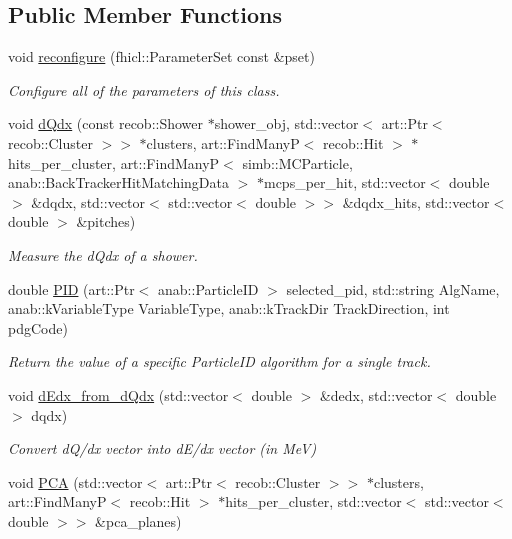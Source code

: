 \subsection*{Public Member Functions}
\begin{DoxyCompactItemize}
\item 
void \hyperlink{group__lee_ga4523185d78d6b7aa94dbf26475750282}{reconfigure} (fhicl\-::\-Parameter\-Set const \&pset)
\begin{DoxyCompactList}\small\item\em Configure all of the parameters of this class. \end{DoxyCompactList}\item 
void \hyperlink{group__lee_ga7ccbc2f2f2b594291e89f29c8e4616a7}{d\-Qdx} (const recob\-::\-Shower $\ast$shower\-\_\-obj, std\-::vector$<$ art\-::\-Ptr$<$ recob\-::\-Cluster $>$$>$ $\ast$clusters, art\-::\-Find\-Many\-P$<$ recob\-::\-Hit $>$ $\ast$hits\-\_\-per\-\_\-cluster, art\-::\-Find\-Many\-P$<$ simb\-::\-M\-C\-Particle, anab\-::\-Back\-Tracker\-Hit\-Matching\-Data $>$ $\ast$mcps\-\_\-per\-\_\-hit, std\-::vector$<$ double $>$ \&dqdx, std\-::vector$<$ std\-::vector$<$ double $>$$>$ \&dqdx\-\_\-hits, std\-::vector$<$ double $>$ \&pitches)
\begin{DoxyCompactList}\small\item\em Measure the d\-Qdx of a shower. \end{DoxyCompactList}\item 
double \hyperlink{group__lee_gab3e573f8d2d733f94b8ca862d7343864}{P\-I\-D} (art\-::\-Ptr$<$ anab\-::\-Particle\-I\-D $>$ selected\-\_\-pid, std\-::string Alg\-Name, anab\-::k\-Variable\-Type Variable\-Type, anab\-::k\-Track\-Dir Track\-Direction, int pdg\-Code)
\begin{DoxyCompactList}\small\item\em Return the value of a specific Particle\-I\-D algorithm for a single track. \end{DoxyCompactList}\item 
void \hyperlink{group__lee_ga2844c7f27f79fbe5e16d9c674ca4afa1}{d\-Edx\-\_\-from\-\_\-d\-Qdx} (std\-::vector$<$ double $>$ \&dedx, std\-::vector$<$ double $>$ dqdx)
\begin{DoxyCompactList}\small\item\em Convert d\-Q/dx vector into d\-E/dx vector (in Me\-V) \end{DoxyCompactList}\item 
void \hyperlink{group__lee_gac5f41d2b1bee9a0f761179f3059f8a49}{P\-C\-A} (std\-::vector$<$ art\-::\-Ptr$<$ recob\-::\-Cluster $>$$>$ $\ast$clusters, art\-::\-Find\-Many\-P$<$ recob\-::\-Hit $>$ $\ast$hits\-\_\-per\-\_\-cluster, std\-::vector$<$ std\-::vector$<$ double $>$$>$ \&pca\-\_\-planes)

\end{DoxyCompactItemize}
